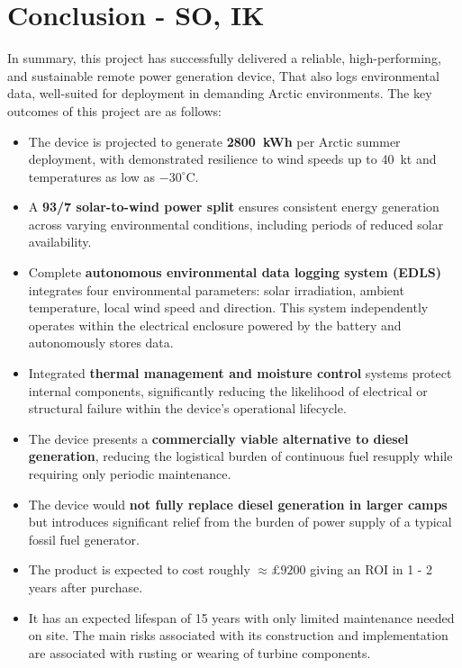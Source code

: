 \documentclass[11pt,a4paper]{article}
\begin{document}
\section{Conclusion - SO, IK}

In summary, this project has successfully delivered a reliable, high-performing, and sustainable remote power generation device, That also logs environmental data, well-suited for deployment in demanding Arctic environments. The key outcomes of this project are as follows:

\begin{itemize}
    \item The device is projected to generate \textbf{2800~kWh} per Arctic summer deployment, with demonstrated resilience to wind speeds up to 40~kt and temperatures as low as $-30^\circ$C.
    \item A \textbf{93/7 solar-to-wind power split} ensures consistent energy generation across varying environmental conditions, including periods of reduced solar availability.
    \item Complete \textbf{autonomous environmental data logging system (EDLS)} integrates four environmental parameters: solar irradiation, ambient temperature, local wind speed and direction. This system independently operates within the electrical enclosure powered by the battery and autonomously stores data. 
    \item Integrated \textbf{thermal management and moisture control} systems protect internal components, significantly reducing the likelihood of electrical or structural failure within the device's operational lifecycle.
    \item The device presents a \textbf{commercially viable alternative to diesel generation}, reducing the logistical burden of continuous fuel resupply while requiring only periodic maintenance.
    \item The device would \textbf{not fully replace diesel generation in larger camps} but introduces significant relief from the burden of power supply of a typical fossil fuel generator.
    \item The product is expected to cost roughly $\approx \pounds 9200$ giving an ROI in 1 - 2 years after purchase.
    \item It has an expected lifespan of 15 years with only limited maintenance needed on site. The main risks associated with its construction and implementation are associated with rusting or wearing of turbine components.
\end{itemize}
\end{document}
